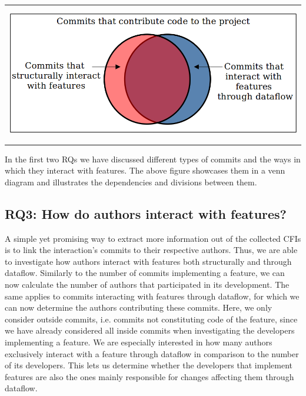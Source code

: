\begin{center}
\begin{tabular}{c}
\includegraphics[height=6cm]{gfx/Commits-of-a-Software-Project.png}
\end{tabular}
\end{center}
In the first two RQs we have discussed different types of commits and the ways in which they interact with features. 
The above figure showcases them in a venn diagram and illustrates the dependencies and divisions between them.

\subsection[RQ3: How do authors interact with features?]{\textbf{RQ3}: How do authors interact with features?}\label{sec:meth:RQ3}

A simple yet promising way to extract more information out of the collected CFIs is to link the interaction's commits to their respective authors.
Thus, we are able to investigate how authors interact with features both structurally and through dataflow.
Similarly to the number of commits implementing a feature, we can now calculate the number of authors that participated in its development.
The same applies to commits interacting with features through dataflow, for which we can now determine the authors contributing these commits.
Here, we only consider outside commits, i.e. commits not constituting code of the feature, since we have already considered all inside commits when investigating the developers implementing a feature.
We are especially interested in how many authors exclusively interact with a feature through dataflow in comparison to the number of its developers.
This lets us determine whether the developers that implement features are also the ones mainly responsible for changes affecting them through dataflow.

